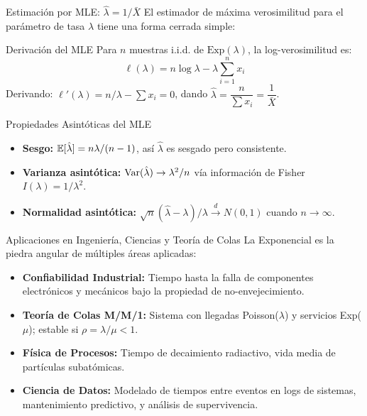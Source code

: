 \documentclass[10pt, aspectratio=169]{beamer}
\begin{document}
\begin{frame}{Estimación por MLE: $\hat{\lambda} = 1/\bar{X}$}
  \footnotesize
  El estimador de máxima verosimilitud para el parámetro de tasa $\lambda$ tiene una forma cerrada simple: \pause

  \vspace{0.1cm}
  \begin{block}{Derivación del MLE}
    Para $n$ muestras i.i.d. de $\text{Exp}(\lambda)$, la log-verosimilitud es:
    $$\ell(\lambda) = n \log \lambda - \lambda \sum_{i=1}^{n} x_i$$
    Derivando: $\ell'(\lambda) = n/\lambda - \sum x_i = 0$, dando $\hat{\lambda} = \dfrac{n}{\sum x_i} = \dfrac{1}{\bar{X}}$.
  \end{block}

  \vspace{0.1cm}
  \pause
  \begin{alertblock}{Propiedades Asintóticas del MLE}
    \begin{itemize}\itemsep=0.05cm
      \item \textbf{Sesgo:} $\mathbb{E}[\hat{\lambda}] = n\lambda/(n-1)$, así $\hat{\lambda}$ es sesgado pero consistente.
      \item \textbf{Varianza asintótica:} $\operatorname{Var}(\hat{\lambda}) \to \lambda^{2}/n$ vía información de Fisher $I(\lambda) = 1/\lambda^{2}$.
      \item \textbf{Normalidad asintótica:} $\sqrt{n}(\hat{\lambda} - \lambda)/\lambda \xrightarrow{d} N(0, 1)$ cuando $n \to \infty$.
    \end{itemize}
  \end{alertblock}
\end{frame}

\begin{frame}{Aplicaciones en Ingeniería, Ciencias y Teoría de Colas}
  \footnotesize
  La Exponencial es la piedra angular de múltiples áreas aplicadas: \pause

  \vspace{0.15cm}
  \begin{itemize}\itemsep=0.12cm
    \item \textbf{Confiabilidad Industrial:} Tiempo hasta la falla de componentes electrónicos y mecánicos bajo la propiedad de no-envejecimiento. \pause
    \item \textbf{Teoría de Colas M/M/1:} Sistema con llegadas Poisson($\lambda$) y servicios Exp($\mu$); estable si $\rho = \lambda/\mu < 1$. \pause
    \item \textbf{Física de Procesos:} Tiempo de decaimiento radiactivo, vida media de partículas subatómicas. \pause
    \item \textbf{Ciencia de Datos:} Modelado de tiempos entre eventos en logs de sistemas, mantenimiento predictivo, y análisis de supervivencia.
  \end{itemize}
\end{frame}
\end{document}
